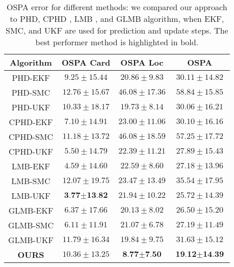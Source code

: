 \documentclass[runningheads]{llncs}
\begin{document}

\begin{table}[t]
\small{
\begin{center}
\begin{tabular}{c | c c c} 
Algorithm & OSPA Card & OSPA Loc & OSPA \\
\hline
PHD-EKF & $9.25 \pm 15.44$ & $20.86 \pm 9.83$ & $30.11 \pm 14.82$ \\
PHD-SMC & $12.76 \pm 15.67$ & $46.08 \pm 17.36$ & $58.84 \pm 15.85$ \\
PHD-UKF & $10.33 \pm 18.17$ & $19.73 \pm 8.14$ & $30.06 \pm 16.21$ \\
\hdashline
CPHD-EKF & $7.10 \pm 14.91$ & $23.00 \pm 11.06$ & $30.10 \pm 16.16$ \\
CPHD-SMC & $11.18 \pm 13.72$ & $46.08 \pm 18.59$ & $57.25 \pm 17.72$ \\
CPHD-UKF & $5.50 \pm 14.79$ & $22.39 \pm 11.21$ & $27.89 \pm 15.43$ \\
\hdashline
LMB-EKF & $4.59 \pm 14.60$ & $22.59 \pm 8.60$ & $27.18 \pm 13.96$ \\
LMB-SMC & $12.07 \pm 19.75$ & $23.47 \pm 13.49$ & $35.54 \pm 17.95$ \\
LMB-UKF & $\textbf{3.77} \pm \textbf{13.82}$ & $21.94 \pm 10.22$ & $25.72 \pm 14.39$ \\
\hdashline
GLMB-EKF & $6.37 \pm 17.66$ & $20.13 \pm 8.02$ & $26.50 \pm 15.20$ \\
GLMB-SMC & $6.11 \pm 11.91$ & $21.07 \pm 6.78$ & $27.19 \pm 11.49$ \\
GLMB-UKF & $11.79 \pm 16.34$ & $19.84 \pm 9.75$ & $31.63 \pm 15.12$ \\
\hdashline
\textbf{OURS} & $10.36 \pm 13.25$ & $\textbf{8.77} \pm \textbf{7.50}$ & $\textbf{19.12} \pm \textbf{14.39}$ \\
\end{tabular}
\end{center}
}


\caption{OSPA error for different methods: we compared our approach to PHD, CPHD \cite{Nagappa:2017,Mahler:2007}, LMB \cite{Reuter:2014}, and GLMB \cite{Vo:2014,Vo:2017} algorithm, when EKF, SMC, and UKF are used for prediction and update steps. The best performer method is highlighted in bold.}
\label{tab:table1}
\end{table}
\end{document}
